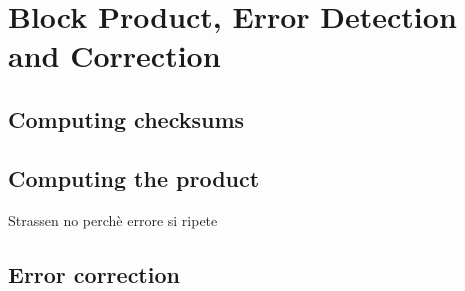 \section{Block Product, Error Detection and Correction}
\label{sec:block}

\subsection{Computing checksums}
\subsection{Computing the product}
Strassen no perchè errore si ripete
\subsection{Error correction}
